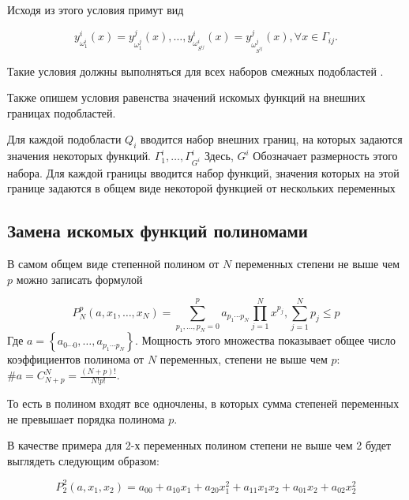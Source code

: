 \documentclass[a4paper,12pt]{article}
\begin{document}
  Исходя из этого условия примут вид
  
  \begin{equation}
    y_{\omega_1^i}^i(x) = y_{\omega_1^j}^j(x),
    \ldots,
    y_{\omega_{S^{ij}}^i}^i(x) = y_{\omega_{S^{ij}}^j}^j(x), \forall x \in \Gamma_{ij}.
  \end{equation}

  Такие условия должны выполняться для всех наборов смежных
  подобластей \Gamma.

  Также опишем условия равенства значений искомых функций на внешних
  границах подобластей.

  Для каждой подобласти $Q_i$ вводится набор внешних границ, на
  которых задаются значения некоторых
  функций. $\Gamma_1^i,\ldots,\Gamma_{G^i}^i$ Здесь, $G^i$ Обозначает
  размерность этого набора. Для каждой границы вводится набор функций,
  значения которых на этой границе задаются в общем виде некоторой функцией от
  нескольких переменных
  

  \subsection{Замена искомых функций полиномами}


  В самом общем виде степенной полином от $N$ переменных степени не выше чем $p$ можно
  записать формулой
  
  \begin{equation}
    P_N^p(a,x_1,\ldots,x_N)=
    \displaystyle\sum_{p_1,\ldots,p_N=0}^{p}a_{p_1 \cdots p_N}\prod_{j=1}^{N}x^{p_j},
    \displaystyle\sum_{j=1}^{N}p_j \le p
  \end{equation}
  Где $a = \left\{ a_{0 \cdots 0},\ldots,a_{p_1 \cdots p_N} \right\}$.
  Мощность этого множества показывает общее число
  коэффициентов полинома от $N$ переменных, степени не выше чем $p$:
  $ \#a = C_{N+p}^N = \frac{(N+p)!}{N!p!}$.
  
  То есть в полином входят все одночлены, в которых сумма степеней
  переменных не превышает порядка полинома $p$.

  В качестве примера для 2-х переменных полином степени не выше чем 2
  будет выглядеть следующим образом:

  \begin{equation*}
    P_2^2(a,x_1,x_2) = a_{00} + a_{10}x_1 + a_{20}x_1^2+ a_{11}x_1x_2 + a_{01}x_2 + a_{02}x_2^2
  \end{equation*}
\end{document}
